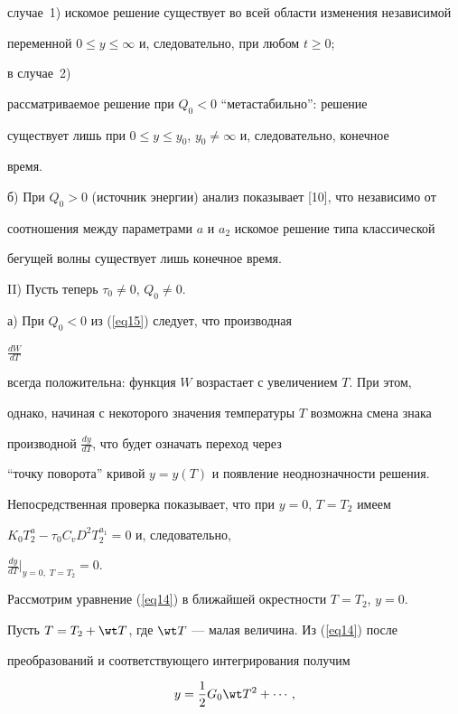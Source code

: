 случае~1) искомое решение существует во всей области изменения независимой


переменной $0\le y\le\infty$ и, следовательно, при любом $t\ge0$;


в случае~2)


рассматриваемое решение при $Q_0<0$ ``метастабильно'': решение


существует лишь при $0\le y\le y_0$, $y_0\ne\infty$ и, следовательно, конечное


время.





б) При $Q_0>0$ (источник энергии) анализ показывает [10], что независимо от


соотношения между параметрами $a$ и $a_2$ искомое решение типа классической


бегущей волны существует лишь конечное время.





II) Пусть теперь $\tau_0\ne0$, $Q_0\ne0$.





а) При $Q_0<0$ из (\ref{eq15}) следует, что производная


$\frac{dW}{dT}$


всегда положительна: функция $W$ возрастает с увеличением $T$. При этом,


однако, начиная с некоторого значения температуры $T$ возможна смена знака


производной $\frac{dy}{dT}$, что будет означать переход через


``точку поворота'' кривой $y=y(T)$ и появление неоднозначности решения.





Непосредственная проверка показывает, что при $y=0$, $T=T_2$ имеем


$K_0T_2^a-\tau_0C_vD^2T_2^{a_1}=0$ и, следовательно,


$\frac{dy}{dT}\big|_{y=0,\;T=T_2}=0$.





Рассмотрим уравнение (\ref{eq14}) в ближайшей окрестности $T=T_2$, $y=0$.


Пусть $T=T_2+\wt T$, где $\wt T$ --- малая величина. Из (\ref{eq14}) после


преобразований и соответствующего интегрирования получим


\begin{equation}\label{eq17}


y=\frac12 G_0\wt T^2+\dotsb,


\end{equation}


